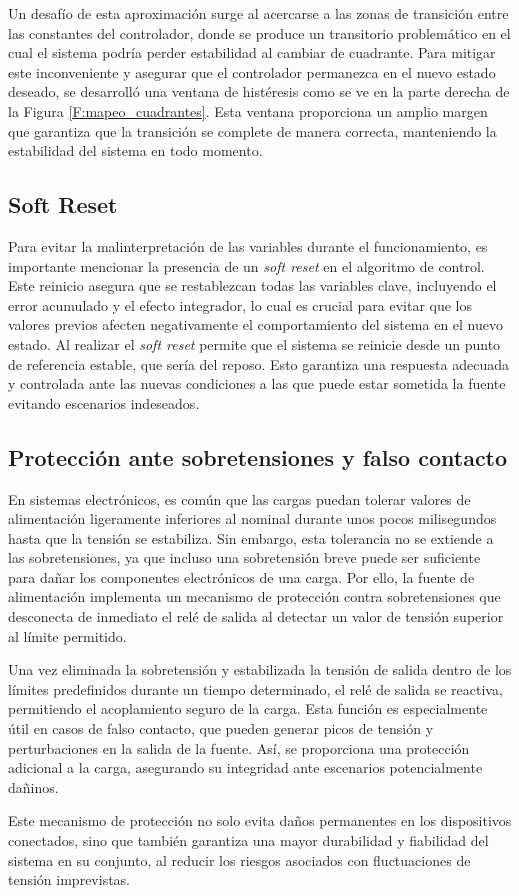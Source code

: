 Un desafío de esta aproximación surge al acercarse a las zonas de transición entre las constantes del controlador, donde se produce un transitorio problemático en el cual el sistema podría perder estabilidad al cambiar de cuadrante. Para mitigar este inconveniente y asegurar que el controlador permanezca en el nuevo estado deseado, se desarrolló una ventana de histéresis como se ve en la parte derecha de la Figura \ref{F:mapeo_cuadrantes}. Esta ventana proporciona un amplio margen que garantiza que la transición se complete de manera correcta, manteniendo la estabilidad del sistema en todo momento.


\subsection{Soft Reset}
Para evitar la malinterpretación de las variables durante el funcionamiento, es importante mencionar la presencia de un \textit{soft reset} en el algoritmo de control. Este reinicio asegura que se restablezcan todas las variables clave, incluyendo el error acumulado y el efecto integrador, lo cual es crucial para evitar que los valores previos afecten negativamente el comportamiento del sistema en el nuevo estado. Al realizar el \textit{soft reset} permite que el sistema se reinicie desde un punto de referencia estable, que sería del reposo. Esto garantiza una respuesta adecuada y controlada ante las nuevas condiciones a las que puede estar sometida la fuente evitando escenarios indeseados.\par 

\subsection{Protección ante sobretensiones y falso contacto}
En sistemas electrónicos, es común que las cargas puedan tolerar valores de alimentación ligeramente inferiores al nominal durante unos pocos milisegundos hasta que la tensión se estabiliza. Sin embargo, esta tolerancia no se extiende a las sobretensiones, ya que incluso una sobretensión breve puede ser suficiente para dañar los componentes electrónicos de una carga. Por ello, la fuente de alimentación implementa un mecanismo de protección contra sobretensiones que desconecta de inmediato el relé de salida al detectar un valor de tensión superior al límite permitido. \par

Una vez eliminada la sobretensión y estabilizada la tensión de salida dentro de los límites predefinidos durante un tiempo determinado, el relé de salida se reactiva, permitiendo el acoplamiento seguro de la carga. Esta función es especialmente útil en casos de falso contacto, que pueden generar picos de tensión y perturbaciones en la salida de la fuente. Así, se proporciona una protección adicional a la carga, asegurando su integridad ante escenarios potencialmente dañinos. \par

Este mecanismo de protección no solo evita daños permanentes en los dispositivos conectados, sino que también garantiza una mayor durabilidad y fiabilidad del sistema en su conjunto, al reducir los riesgos asociados con fluctuaciones de tensión imprevistas. \par
